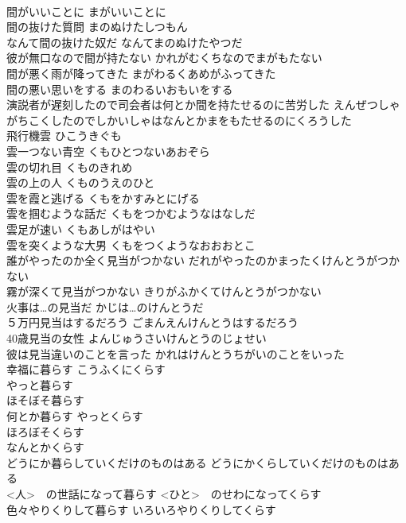 \documentclass[8pt]{extreport}
\begin{document}
\begin{CJK}{UTF8}{min}
\\	間がいいことに	まがいいことに	
\\	間の抜けた質問	まのぬけたしつもん	
\\	なんて間の抜けた奴だ	なんてまのぬけたやつだ	
\\	彼が無口なので間が持たない	かれがむくちなのでまがもたない	
\\	間が悪く雨が降ってきた	まがわるくあめがふってきた	
\\	間の悪い思いをする	まのわるいおもいをする	
\\	演説者が遅刻したので司会者は何とか間を持たせるのに苦労した	えんぜつしゃがちこくしたのでしかいしゃはなんとかまをもたせるのにくろうした	
\\	飛行機雲	ひこうきぐも	
\\	雲一つない青空	くもひとつないあおぞら	
\\	雲の切れ目	くものきれめ	
\\	雲の上の人	くものうえのひと	
\\	雲を霞と逃げる	くもをかすみとにげる	
\\	雲を掴むような話だ	くもをつかむようなはなしだ	
\\	雲足が速い	くもあしがはやい	
\\	雲を突くような大男	くもをつくようなおおおとこ	
\\	誰がやったのか全く見当がつかない	だれがやったのかまったくけんとうがつかない	
\\	霧が深くて見当がつかない	きりがふかくてけんとうがつかない	
\\	火事は…の見当だ	かじは…のけんとうだ	
\\	５万円見当はするだろう	ごまんえんけんとうはするだろう	
\\	40歳見当の女性	よんじゅうさいけんとうのじょせい	
\\	彼は見当違いのことを言った	かれはけんとうちがいのことをいった	
\\	幸福に暮らす	こうふくにくらす	
\\	やっと暮らす 
\\	ほそぼそ暮らす 
\\	何とか暮らす	やっとくらす 
\\	ほろぼそくらす 
\\	なんとかくらす	
\\	どうにか暮らしていくだけのものはある	どうにかくらしていくだけのものはある	
\\	<人>　の世話になって暮らす	<ひと>　のせわになってくらす	
\\	色々やりくりして暮らす	いろいろやりくりしてくらす	

\end{CJK}
\end{document}
